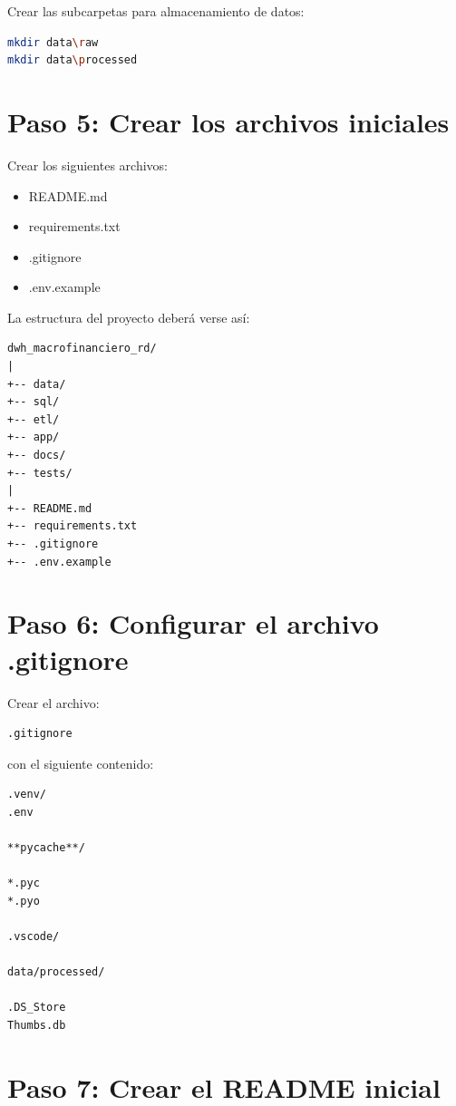 Crear las subcarpetas para almacenamiento de datos:

\begin{lstlisting}[language=bash]
mkdir data\raw
mkdir data\processed
\end{lstlisting}

\section{Paso 5: Crear los archivos iniciales}

Crear los siguientes archivos:

\begin{itemize}
\item README.md
\item requirements.txt
\item .gitignore
\item .env.example
\end{itemize}

La estructura del proyecto deberá verse así:

\begin{verbatim}
dwh_macrofinanciero_rd/
|
+-- data/
+-- sql/
+-- etl/
+-- app/
+-- docs/
+-- tests/
|
+-- README.md
+-- requirements.txt
+-- .gitignore
+-- .env.example
\end{verbatim}

\section{Paso 6: Configurar el archivo .gitignore}

Crear el archivo:

\begin{verbatim}
.gitignore
\end{verbatim}

con el siguiente contenido:

\begin{lstlisting}
.venv/
.env

**pycache**/

*.pyc
*.pyo

.vscode/

data/processed/

.DS_Store
Thumbs.db
\end{lstlisting}

\section{Paso 7: Crear el README inicial}

